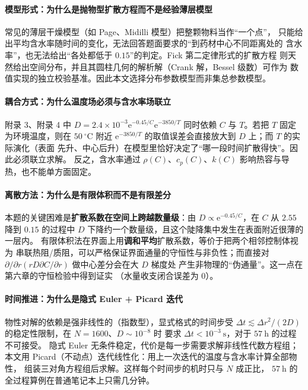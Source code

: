 \paragraph{模型形式：为什么是抛物型扩散方程而不是经验薄层模型}
常见的薄层干燥模型（如 Page、Midilli 模型）把整颗物料当作“一个点”，
只能给出平均含水率随时间的变化，无法回答题面要求的“到药材中心不同距离处的
含水率”，也无法给出“各处都低于 $0.15$”的判定。Fick 第二定律形式的扩散方程
则天然给出空间分布，并且其圆柱几何的解析解（Crank 解，Bessel 级数）可作为
数值实现的独立校验基准。因此本文选择分布参数模型而非集总参数模型。

\paragraph{耦合方式：为什么温度场必须与含水率场联立}
附录 3、附录 4 中 $D=2.4\times10^{-3}\mathrm{e}^{-0.45/C}\mathrm{e}^{-3850/T}$
同时依赖 $C$ 与 $T$。若把 $T$ 固定为环境温度，则在 $50\ ^\circ\mathrm{C}$ 附近
$\mathrm{e}^{-3850/T}$ 的取值误差会直接放大到 $D$ 上；而 $T$ 的实际演化（表面
先升、中心后升）在模型里恰好决定了“哪一段时间扩散得快”。因此必须联立求解。
反之，含水率通过 $\rho(C)$、$c_p(C)$、$k(C)$ 影响热容与导热，也不能单方面固定。

\paragraph{离散方法：为什么是有限体积而不是有限差分}
本题的关键困难是\textbf{扩散系数在空间上跨越数量级}：由
$D\propto \mathrm{e}^{-0.45/C}$，在 $C$ 从 $2.55$ 降到 $0.15$ 的过程中
$D$ 下降约一个数量级，且这个陡降集中发生在表面附近很薄的一层内。
有限体积法在界面上用\textbf{调和平均}扩散系数，等价于把两个相邻控制体视为
串联热阻/质阻，可以严格保证界面通量的守恒性与非负性；而直接对
$\partial/\partial r(rD\partial C/\partial r)$ 做中心差分会在大 $D$ 梯度处
产生非物理的“伪通量”。这一点在第六章的守恒检验中得到证实
（水量收支闭合误差为 $0$）。

\paragraph{时间推进：为什么是隐式 Euler + Picard 迭代}
物性对解的依赖是强非线性的（指数型），显式格式的时间步受
$\Delta t\lesssim \Delta r^2/(2D)$ 的稳定性限制，在 $N=1600$、$D\sim10^{-8}$ 时
要求 $\Delta t<10^{-3}\ \mathrm{s}$，对于 $57\ \mathrm{h}$ 的过程不可接受。
隐式 Euler 无条件稳定，代价是每一步需要求解非线性代数方程组；本文用
Picard（不动点）迭代线性化：用上一次迭代的温度与含水率计算全部物性，
组装三对角方程组后求解。这样每个时间步的机时只与 $N$ 成正比，
$57\ \mathrm{h}$ 的全过程算例在普通笔记本上只需几分钟。

